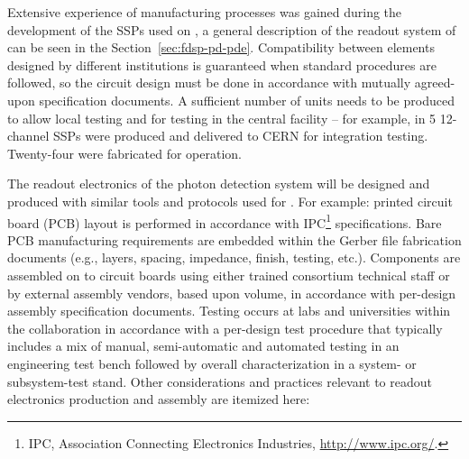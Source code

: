 Extensive experience of manufacturing processes was gained during the development of the SSPs used on , a general description of the readout system of  can be seen in the Section~\ref{sec:fdsp-pd-pde}. Compatibility between elements designed by different institutions is guaranteed when standard procedures are followed, so the circuit design must be done in accordance with mutually agreed-upon specification documents.  A sufficient  number of units needs to be produced to allow local testing and for testing in the central facility -- for example, in  \num{5} 12-channel  SSPs were produced and delivered to CERN for integration testing. Twenty-four were fabricated for  operation. 

The readout electronics of the photon detection system will be designed and produced with similar tools and protocols used for  . For example: printed circuit board (PCB) layout is performed in accordance with IPC\footnote{IPC\texttrademark{}, Association Connecting Electronics Industries, \url{http://www.ipc.org/}.} specifications. Bare PCB manufacturing requirements are embedded within the Gerber file fabrication documents (e.g., layers, spacing, impedance, finish, testing, etc.). Components are assembled on to circuit boards using either trained  consortium technical staff or by external assembly vendors, based upon volume, in accordance with per-design assembly specification documents. Testing occurs at labs and universities within the collaboration in accordance with a per-design test procedure that typically includes a mix of manual, semi-automatic and automated testing in an engineering test bench followed by overall characterization in a system- or subsystem-test stand.
Other considerations and practices relevant to readout electronics production and assembly are itemized here:

